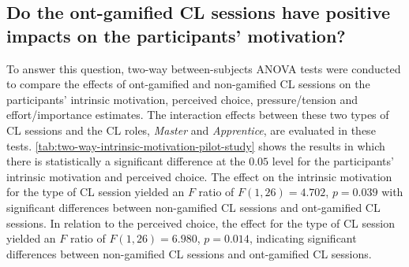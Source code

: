 \subsection*{Do the ont-gamified CL sessions have positive impacts on the participants' motivation?}

To answer this question, two-way between-subjects ANOVA tests were conducted to compare the effects of ont-gamified and non-gamified CL sessions on the participants' intrinsic motivation, perceived choice, pressure/tension and effort/importance estimates.
The interaction effects between these two types of CL sessions and the CL roles, \emph{Master} and \emph{Apprentice}, are evaluated in these tests. \autoref{tab:two-way-intrinsic-motivation-pilot-study} shows the results in which there is statistically a significant difference at the $0.05$ level for the participants' intrinsic motivation and perceived choice.
The effect on the intrinsic motivation for the type of CL session yielded an $F$ ratio of $F(1,26) = 4.702$, $p = 0.039$ with significant differences between non-gamified CL sessions and ont-gamified CL sessions.
In relation to the perceived choice, the effect for the type of CL session yielded an $F$ ratio of $F(1,26) = 6.980$, $p = 0.014$, indicating significant differences between non-gamified CL sessions and ont-gamified CL sessions.

